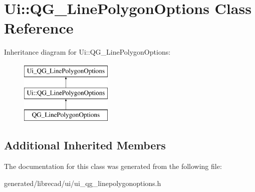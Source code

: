 \hypertarget{classUi_1_1QG__LinePolygonOptions}{\section{Ui\-:\-:Q\-G\-\_\-\-Line\-Polygon\-Options Class Reference}
\label{classUi_1_1QG__LinePolygonOptions}
}
Inheritance diagram for Ui\-:\-:Q\-G\-\_\-\-Line\-Polygon\-Options\-:\begin{figure}[H]
\begin{center}
\leavevmode
\includegraphics[height=3.000000cm]{classUi_1_1QG__LinePolygonOptions}
\end{center}
\end{figure}
\subsection*{Additional Inherited Members}


The documentation for this class was generated from the following file\-:\begin{DoxyCompactItemize}
\item 
generated/librecad/ui/ui\-\_\-qg\-\_\-linepolygonoptions.\-h\end{DoxyCompactItemize}
